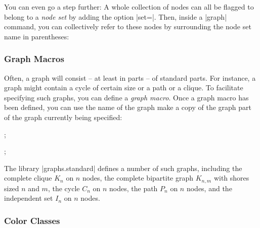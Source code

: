 \begin{codeexample}[]
\end{codeexample}

You can even go a step further: A whole collection of nodes can all be
flagged to belong to a \emph{node set} by adding the option
|set=|. Then, inside a |graph| command, you can
collectively refer to these nodes by surrounding the node set name in
parentheses: 

\begin{codeexample}[]
\end{codeexample}


\subsubsection{Graph Macros}

Often, a graph will consist -- at least in parts -- of standard
parts. For instance, a graph might contain a cycle of certain size or
a path or a clique. To facilitate specifying such graphs, you can
define a \emph{graph macro}. Once a graph macro has been defined, you
can use the name of the graph make a copy of the graph part of the
graph currently being specified:

\begin{codeexample}[]
\tikz {};
\end{codeexample}

\begin{codeexample}[]
\tikz {};
\end{codeexample}

The library |graphs.standard| defines a number of such graphs,
including the complete clique $K_n$ on $n$ nodes, the complete
bipartite graph $K_{n,m}$ with shores sized $n$ and $m$, the cycle
$C_n$ on $n$ nodes, the path $P_n$ on $n$ nodes, and the independent
set $I_n$ on $n$ nodes.


\subsubsection{Color Classes}

